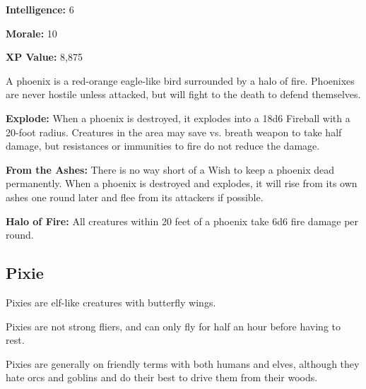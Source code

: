 \begin{multicols*}{2}
{\textbf{Intelligence:} 6

\textbf{Morale:} 10

\textbf{XP Value:} 8,875}

A phoenix is a red-orange eagle-like bird surrounded by a halo of fire. Phoenixes are never hostile unless attacked, but will fight to the death to defend themselves.

\textbf{Explode:} When a phoenix is destroyed, it explodes into a 18d6 Fireball with a 20-foot radius. Creatures in the area may save vs. breath weapon to take half damage, but resistances or immunities to fire do not reduce the damage.

\textbf{From the Ashes:} There is no way short of a Wish to keep a phoenix dead permanently. When a phoenix is destroyed and explodes, it will rise from its own ashes one round later and flee from its attackers if possible.

\textbf{Halo of Fire:} All creatures within 20 feet of a phoenix take 6d6 fire damage per round.

\subsection{Pixie}

Pixies are elf-like creatures with butterfly wings.

Pixies are not strong fliers, and can only fly for half an hour before having to rest.

Pixies are generally on friendly terms with both humans and elves, although they hate orcs and goblins and do their best to drive them from their woods.


\end{multicols*}
